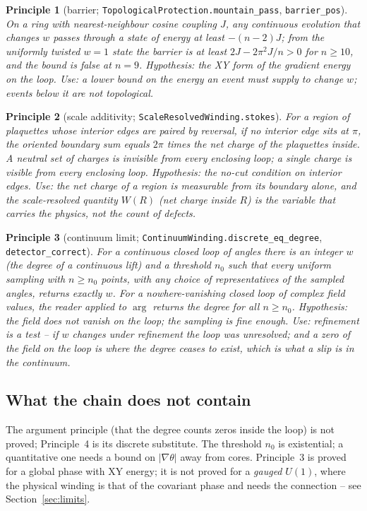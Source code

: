 \documentclass[11pt,a4paper]{article}
\newcommand{\lean}[1]{\texttt{\small #1}}
\newtheorem{principle}{Principle}
\begin{document}
\begin{principle}[barrier; \lean{TopologicalProtection.mountain\_pass}, \lean{barrier\_pos}]
On a ring with nearest-neighbour cosine coupling $J$, any continuous evolution that changes $w$
passes through a state of energy at least $-(n-2)J$; from the uniformly twisted $w=1$ state the
barrier is at least $2J-2\pi^2J/n>0$ for $n\ge10$, and the bound is false at $n=9$.
\emph{Hypothesis:} the XY form of the gradient energy on the loop. \emph{Use:} a lower bound on the
energy an event must supply to change $w$; events below it are not topological.
\end{principle}

\begin{principle}[scale additivity; \lean{ScaleResolvedWinding.stokes}]
For a region of plaquettes whose interior edges are paired by reversal, if no interior edge sits at
$\pi$, the oriented boundary sum equals $2\pi$ times the net charge of the plaquettes inside. A
neutral set of charges is invisible from every enclosing loop; a single charge is visible from every
enclosing loop. \emph{Hypothesis:} the no-cut condition on interior edges. \emph{Use:} the net charge
of a region is measurable \emph{from its boundary alone}, and the scale-resolved quantity $W(R)$
(net charge inside $R$) is the variable that carries the physics, not the count of defects.
\end{principle}

\begin{principle}[continuum limit; \lean{ContinuumWinding.discrete\_eq\_degree}, \lean{detector\_correct}]
For a continuous closed loop of angles there is an integer $w$ (the degree of a continuous lift) and
a threshold $n_0$ such that every uniform sampling with $n\ge n_0$ points, with any choice of
representatives of the sampled angles, returns exactly $w$. For a nowhere-vanishing closed loop of
complex field values, the reader applied to $\arg$ returns the degree for all $n\ge n_0$.
\emph{Hypothesis:} the field does not vanish on the loop; the sampling is fine enough.
\emph{Use:} refinement is a test -- if $w$ changes under refinement the loop was unresolved; and a
zero of the field on the loop is where the degree ceases to exist, which is what a slip is in the
continuum.
\end{principle}

\subsection{What the chain does not contain}
The argument principle (that the degree counts zeros inside the loop) is not proved; Principle~4 is
its discrete substitute. The threshold $n_0$ is existential; a quantitative one needs a bound on
$|\nabla\theta|$ away from cores. Principle~3 is proved for a global phase with XY energy; it is not
proved for a \emph{gauged} $U(1)$, where the physical winding is that of the covariant phase and
needs the connection -- see Section~\ref{sec:limits}.
\end{document}
